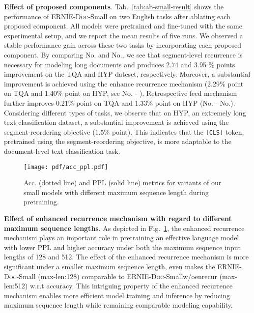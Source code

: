 \documentclass[11pt,a4paper]{article}
\newcommand{\mname}{\textsc{ERNIE-Doc}\xspace}
\begin{document}
\noindent\textbf{Effect of proposed components}. Tab.~\ref{tab:ab-small-result} shows the performance of \mname-Small on two English tasks after ablating each proposed component. All models were pretrained and fine-tuned with the same experimental setup, and we report the mean results of five runs. We observed a stable performance gain across these two tasks by incorporating each proposed component. By comparing No.\uppercase\expandafter{} and No.\uppercase\expandafter{}, we see that segment-level recurrence is necessary for modeling long documents and produces 2.74 and 3.95 \% points improvement on the TQA and HYP dateset, respectively. Moreover, a substantial improvement is achieved using the enhance recurrence mechanism (2.29\% point on TQA and 1.40\% point on HYP, see No.\uppercase\expandafter{} - \uppercase\expandafter{}). Retrospective feed mechanism further improves 0.21\% point on TQA and 1.33\% point on HYP (No.\uppercase\expandafter{} - No.\uppercase\expandafter{}). Considering different types of tasks, we observe that on HYP, an extremely long text classification dataset, a substantial improvement is achieved using the segment-reordering objective (1.5\% point). This indicates that the \texttt{[CLS]} token, pretrained using the segment-reordering objective, is more adaptable to the document-level text classification task.
\begin{figure}[H]
\centering
\texttt{[image: pdf/acc\_ppl.pdf]}
\vspace{-1cm}
\caption{Acc. (dotted line) and PPL (solid line) metrics for variants of our small models with different maximum sequence length during pretraining.}
\label{fig:small_acc_ppl}
\vspace{-0.5cm}
\end{figure}

\noindent\textbf{Effect of enhanced recurrence mechanism with regard to different maximum sequence lengths}. As depicted in Fig.~\ref{fig:small_acc_ppl}, the enhanced recurrence mechanism plays an important role in pretraining an effective language model with lower PPL and higher accuracy under both the maximum sequence input lengths of 128 and 512. 
The effect of the enhanced recurrence mechanism is more significant under a smaller maximum sequence length, even makes the \mname-Small (max-len:128) comparable to \mname-Smallw/oenrecur (max-len:512) w.r.t accuracy. This intriguing property of the enhanced recurrence mechanism enables more efficient model training and inference by reducing maximum sequence length while remaining comparable modeling capability.
\end{document}
